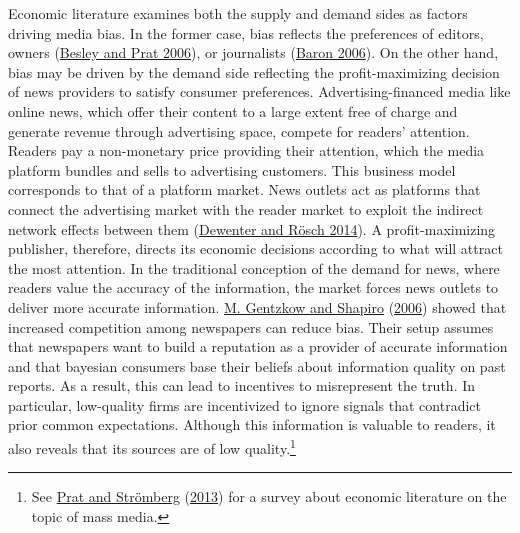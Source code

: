 \documentclass[
  12pt,
]{article}
\begin{document}
Economic literature examines both the supply and demand sides as factors
driving media bias. In the former case, bias reflects the preferences of
editors, owners (\protect\hyperlink{ref-besley_handcuffs_2006}{Besley
and Prat 2006}), or journalists
(\protect\hyperlink{ref-baron_persistent_2006}{Baron 2006}). On the
other hand, bias may be driven by the demand side reflecting the
profit-maximizing decision of news providers to satisfy consumer
preferences. Advertising-financed media like online news, which offer
their content to a large extent free of charge and generate revenue
through advertising space, compete for readers' attention. Readers pay a
non-monetary price providing their attention, which the media platform
bundles and sells to advertising customers. This business model
corresponds to that of a platform market. News outlets act as platforms
that connect the advertising market with the reader market to exploit
the indirect network effects between them
(\protect\hyperlink{ref-dewenter_einfuhrung_2014}{Dewenter and Rösch
2014}). A profit-maximizing publisher, therefore, directs its economic
decisions according to what will attract the most attention. In the
traditional conception of the demand for news, where readers value the
accuracy of the information, the market forces news outlets to deliver
more accurate information.
\protect\hyperlink{ref-gentzkow_media_2006}{M. Gentzkow and Shapiro}
(\protect\hyperlink{ref-gentzkow_media_2006}{2006}) showed that
increased competition among newspapers can reduce bias. Their setup
assumes that newspapers want to build a reputation as a provider of
accurate information and that bayesian consumers base their beliefs
about information quality on past reports. As a result, this can lead to
incentives to misrepresent the truth. In particular, low-quality firms
are incentivized to ignore signals that contradict prior common
expectations. Although this information is valuable to readers, it also
reveals that its sources are of low quality.\footnote{See
  \protect\hyperlink{ref-acemoglu_political_2013}{Prat and Strömberg}
  (\protect\hyperlink{ref-acemoglu_political_2013}{2013}) for a survey
  about economic literature on the topic of mass media.}
\end{document}
